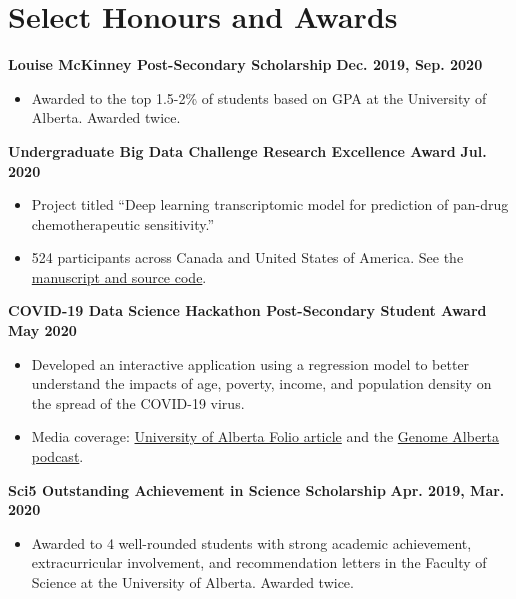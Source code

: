 \documentclass{article}
\begin{document}
\section*{\textcolor{my_colour}{Select Honours and Awards}}
\vspace{-.25em} \hrulefill \vspace{.75em}

\textbf{Louise McKinney Post-Secondary Scholarship} \hfill \textbf{Dec. 2019, Sep. 2020}
\begin{itemize}
    \item Awarded to the top 1.5-2\% of students based on GPA at the University of Alberta. Awarded twice.
\end{itemize}

\textbf{Undergraduate Big Data Challenge Research Excellence Award} \hfill \textbf{Jul. 2020}
\begin{itemize}
    \item Project titled ``Deep learning transcriptomic model for prediction of pan-drug chemotherapeutic sensitivity.''
    \item 524 participants across Canada and United States of America. See the \href{https://github.com/tig3r66/youreka_genes}{manuscript and source code}.
\end{itemize}

\textbf{COVID-19 Data Science Hackathon Post-Secondary Student Award} \hfill \textbf{May 2020}
\begin{itemize}
    \item Developed an interactive application using a regression model to better understand the impacts of age, poverty, income, and population density on the spread of the COVID-19 virus.
    \item Media coverage: \href{https://www.folio.ca/students-develop-online-tool-to-predict-covid-19-spread-based-on-demographics/}{University of Alberta Folio article} and the \href{https://genomealberta.ca/genomics/genomics_blog_08182001.aspx}{Genome Alberta podcast}.
\end{itemize}

\textbf{Sci5 Outstanding Achievement in Science Scholarship} \hfill \textbf{Apr. 2019, Mar. 2020}
\begin{itemize}
    \item Awarded to 4 well-rounded students with strong academic achievement, extracurricular involvement, and recommendation letters in the Faculty of Science at the University of Alberta. Awarded twice.
\end{itemize}
\end{document}
